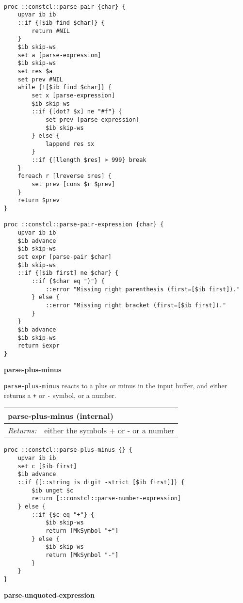 \documentclass{report}
\begin{document}
\noindent\makebox[\linewidth]{\rule{\linewidth}{0.4pt}}
\begin{lstlisting}
 
proc ::constcl::parse-pair {char} {
    upvar ib ib
    ::if {[$ib find $char]} {
        return #NIL
    }
    $ib skip-ws
    set a [parse-expression]
    $ib skip-ws
    set res $a
    set prev #NIL
    while {![$ib find $char]} {
        set x [parse-expression]
        $ib skip-ws
        ::if {[dot? $x] ne "#f"} {
            set prev [parse-expression]
            $ib skip-ws
        } else {
            lappend res $x
        }
        ::if {[llength $res] > 999} break
    }
    foreach r [lreverse $res] {
        set prev [cons $r $prev]
    }
    return $prev
}
 
proc ::constcl::parse-pair-expression {char} {
    upvar ib ib
    $ib advance
    $ib skip-ws
    set expr [parse-pair $char]
    $ib skip-ws
    ::if {[$ib first] ne $char} {
        ::if {$char eq ")"} {
            ::error "Missing right parenthesis (first=[$ib first])."
        } else {
            ::error "Missing right bracket (first=[$ib first])."
        }
    }
    $ib advance
    $ib skip-ws
    return $expr
}
\end{lstlisting}
\noindent\makebox[\linewidth]{\rule{\linewidth}{0.4pt}}

\textbf{parse-plus-minus}


\texttt{parse-plus-minus} reacts to a plus or minus in the input buffer, and either returns a \texttt{+} or \texttt{-} symbol, or a number.

\begin{tabular}{ |l l| }
\hline
\multicolumn{2}{|l|}{parse-plus-minus (internal)} \\
\hline
\textit{Returns:} & either the symbols + or - or a number \\
\hline
\end{tabular}

\noindent\makebox[\linewidth]{\rule{\linewidth}{0.4pt}}
\begin{lstlisting}
proc ::constcl::parse-plus-minus {} {
    upvar ib ib
    set c [$ib first]
    $ib advance
    ::if {[::string is digit -strict [$ib first]]} {
        $ib unget $c
        return [::constcl::parse-number-expression]
    } else {
        ::if {$c eq "+"} {
            $ib skip-ws
            return [MkSymbol "+"]
        } else {
            $ib skip-ws
            return [MkSymbol "-"]
        }
    }
}
\end{lstlisting}
\noindent\makebox[\linewidth]{\rule{\linewidth}{0.4pt}}

\textbf{parse-unquoted-expression}
\end{document}
